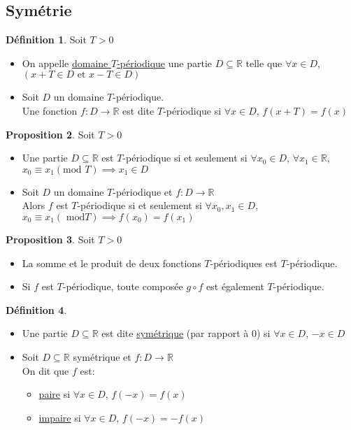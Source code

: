 \documentclass[10pt,a4paper]{article}
\theoremstyle{definition}
\newtheorem{proposition}{Proposition}[section]
\newtheorem{definition}[proposition]{Définition}
\begin{document}
\subsection{Symétrie}
\begin{definition}
Soit $T > 0$
\begin{itemize}
\item On appelle \uline{domaine $T$-périodique} une partie $D \subseteq \mathbb{R}$ telle que $\forall x \in D$, $(x + T \in D \text{ et } x - T \in D)$
\item Soit $D$ un domaine $T$-périodique. \\
Une fonction $f: D \to \mathbb{R}$ est dite $T$-périodique si $\forall x \in D$, $f(x + T) = f(x)$
\end{itemize}
\end{definition}

\begin{proposition}
Soit $T > 0$
\begin{itemize}
\item Une partie $D \subseteq \mathbb{R}$ est $T$-périodique si et seulement si $\forall x_0 \in D$, $\forall x_1 \in \mathbb{R}$, $x_0 \equiv x_1 (\text{mod }T) \implies x_1 \in D$
\item Soit $D$ un domaine $T$-périodique et $f: D \to \mathbb{R}$ \\
Alors $f$ est $T$-périodique si et seulement si $\forall x_0, x_1 \in D$, $x_0 \equiv x_1 (\text{ mod}T) \implies f(x_0) = f(x_1)$
\end{itemize}
\end{proposition}
\begin{proposition}
Soit $T > 0$
\begin{itemize}
\item La somme et le produit de deux fonctions $T$-périodiques est $T$-périodique.
\item Si $f$ est $T$-périodique, toute composée $g \circ f$ est également $T$-périodique.
\end{itemize}
\end{proposition}
\begin{definition}
\hfill
\begin{itemize}
\item Une partie $D \subseteq \mathbb{R}$ est dite \uline{symétrique} (par rapport à $0$) si $\forall x \in D$, $-x \in D$
\item Soit $D \subseteq \mathbb{R}$ symétrique et $f: D \to \mathbb{R}$ \\
On dit que $f$ est:
\begin{itemize}
\item \uline{paire} si $\forall x \in D$, $f(-x) = f(x)$
\item \uline{impaire} si $\forall x \in D$, $f(-x) = -f(x)$
\end{itemize}
\end{itemize}
\end{definition}
\end{document}
